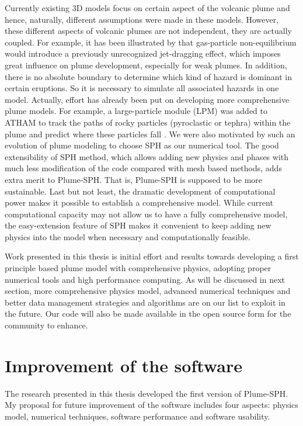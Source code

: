 Currently existing 3D models focus on certain aspect of the volcanic plume and hence, naturally, different assumptions were made in these models. However, these different aspects of volcanic plumes are not independent, they are actually coupled. For example, it has been illustrated by \cite{cerminara2016large} that gas-particle non-equilibrium would introduce a previously unrecognized jet-dragging effect, which imposes great influence on plume development, especially for weak plumes. In addition, there is no absolute boundary to determine which kind of hazard is dominant in certain eruptions. So it is necessary to simulate all associated hazards in one model. Actually, effort has already been put on developing more comprehensive plume models. For example, a large-particle module (LPM) was added to ATHAM to track the paths of rocky particles (pyroclastic or tephra) within the plume and predict where these particles fall \citep{kobs2009modeling}. We were also motivated by such an evolution of plume modeling to choose SPH as our numerical tool. The good extensibility of SPH method, which allows adding new physics and phases with much less modification of the code compared with mesh based methods, adds extra merit to Plume-SPH. That is, Plume-SPH is supposed to be more sustainable.
Last but not least, the dramatic development of computational power makes it possible to establish a comprehensive model. While current computational capacity may not allow us to have a fully comprehensive model, the easy-extension feature of SPH makes it convenient to keep adding new physics into the model when necessary and computationally feasible. 

Work presented in this thesis is initial effort and results towards developing a first principle based plume model with comprehensive physics, adopting proper numerical tools and high performance computing. As will be discussed in next section, more comprehensive physics model, advanced numerical techniques and better data management strategies and algorithms are on our list to exploit in the future. Our code will also be made available in the open source form for the community to enhance.

\section{Improvement of the software}
The research presented in this thesis developed the first version of Plume-SPH.
My proposal for future improvement of the software includes four aspects: physics model, numerical techniques, software performance and software usability.

